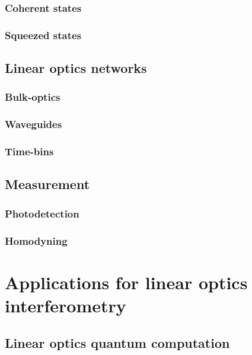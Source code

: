 \documentclass[aps,rmp,twocolumn,amsmath,amssymb,nofootinbib,superscriptaddress]{revtex4}
\newcommand{\comment}[1]{{\color{blue}{#1}}}
\begin{document}
\subsubsection{Coherent states}

\subsubsection{Squeezed states}

\subsection{Linear optics networks}

\subsubsection{Bulk-optics}

\subsubsection{Waveguides}

\subsubsection{Time-bins}

\comment{Discuss fibre-loop architecture}

\subsection{Measurement}

\subsubsection{Photodetection}

\comment{Discuss number-resolved and bucket detectors, multiplexed detection, APDs, current micropillar detectors}

\subsubsection{Homodyning}

\section{Applications for linear optics interferometry}

\subsection{Linear optics quantum computation}
\end{document}
